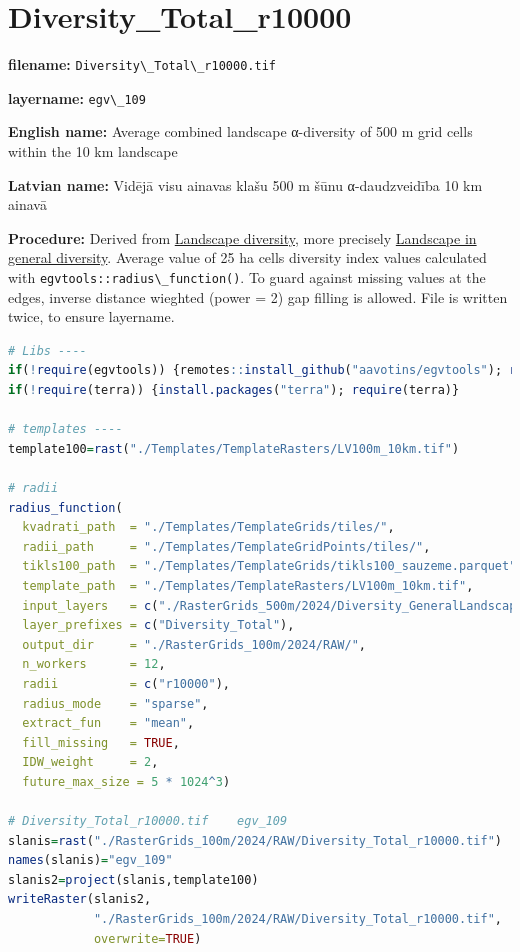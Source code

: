 \documentclass[
]{book}
\newcommand{\passthrough}[1]{#1}
\begin{document}
\section{Diversity\_Total\_r10000}\label{ch06.109}

\textbf{filename:} \passthrough{\lstinline!Diversity\_Total\_r10000.tif!}

\textbf{layername:} \passthrough{\lstinline!egv\_109!}

\textbf{English name:} Average combined landscape α-diversity of 500 m grid cells within the 10 km landscape

\textbf{Latvian name:} Vidējā visu ainavas klašu 500 m šūnu α-daudzveidība 10 km ainavā

\textbf{Procedure:} Derived from \hyperref[Ch05.04]{Landscape diversity}, more precisely
\hyperref[Ch05.04.01]{Landscape in general diversity}. Average value of 25 ha
cells diversity index values calculated with \passthrough{\lstinline!egvtools::radius\_function()!}. To
guard against missing values at the edges, inverse distance wieghted (power = 2)
gap filling is allowed. File is written twice, to ensure layername.

\begin{lstlisting}[language=R]
# Libs ----
if(!require(egvtools)) {remotes::install_github("aavotins/egvtools"); require(egvtools)}
if(!require(terra)) {install.packages("terra"); require(terra)}

# templates ----
template100=rast("./Templates/TemplateRasters/LV100m_10km.tif")

# radii
radius_function(
  kvadrati_path  = "./Templates/TemplateGrids/tiles/",
  radii_path     = "./Templates/TemplateGridPoints/tiles/",
  tikls100_path  = "./Templates/TemplateGrids/tikls100_sauzeme.parquet",
  template_path  = "./Templates/TemplateRasters/LV100m_10km.tif",
  input_layers   = c("./RasterGrids_500m/2024/Diversity_GeneralLandscape_500x.tif"),
  layer_prefixes = c("Diversity_Total"),
  output_dir     = "./RasterGrids_100m/2024/RAW/",
  n_workers      = 12,
  radii          = c("r10000"),
  radius_mode    = "sparse",
  extract_fun    = "mean",
  fill_missing   = TRUE,
  IDW_weight     = 2,
  future_max_size = 5 * 1024^3)

# Diversity_Total_r10000.tif    egv_109
slanis=rast("./RasterGrids_100m/2024/RAW/Diversity_Total_r10000.tif")
names(slanis)="egv_109"
slanis2=project(slanis,template100)
writeRaster(slanis2,
            "./RasterGrids_100m/2024/RAW/Diversity_Total_r10000.tif",
            overwrite=TRUE)
\end{lstlisting}
\end{document}
